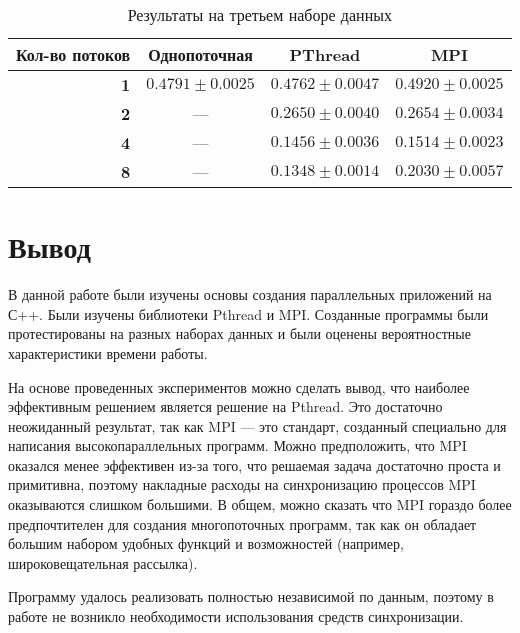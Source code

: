 \begin{table}[h!]
\caption{Результаты на третьем наборе данных}

\center
\begin{tabular}{|r|c|c|c|}
\hline 
\textbf{Кол-во потоков} & \textbf{Однопоточная} & \textbf{PThread} & \textbf{MPI} \\ 
\hline 
\textbf{1} & $0.4791 \pm 0.0025$ & $0.4762 \pm 0.0047$ & $0.4920 \pm 0.0025$ \\ 
\hline 
\textbf{2} & ---                 & $0.2650 \pm 0.0040$ & $0.2654 \pm 0.0034$ \\ 
\hline 
\textbf{4} & ---                 & $0.1456 \pm 0.0036$ & $0.1514 \pm 0.0023$ \\ 
\hline 
\textbf{8} & ---                 & \boldmath$0.1348 \pm 0.0014$ & $0.2030 \pm 0.0057$ \\ 
\hline 
\end{tabular}

\label{tab:input3}
\end{table}

\section{Вывод}
В данной работе были изучены основы создания параллельных приложений на С++. Были изучены библиотеки Pthread и MPI. Созданные программы были протестированы на разных наборах данных и были оценены вероятностные характеристики времени работы.

На основе проведенных экспериментов можно сделать вывод, что наиболее эффективным решением является  решение на Pthread. Это достаточно неожиданный результат, так как MPI --- это стандарт, созданный специально для написания высокопараллельных программ. Можно предположить, что MPI оказался менее эффективен из-за того, что решаемая задача достаточно проста и примитивна, поэтому накладные расходы на синхронизацию процессов MPI оказываются слишком большими. В общем, можно сказать что MPI гораздо более предпочтителен для создания многопоточных программ, так как он обладает большим набором удобных функций и возможностей (например, широковещательная рассылка).

Программу удалось реализовать полностью независимой по данным, поэтому в работе не возникло необходимости использования средств синхронизации.

